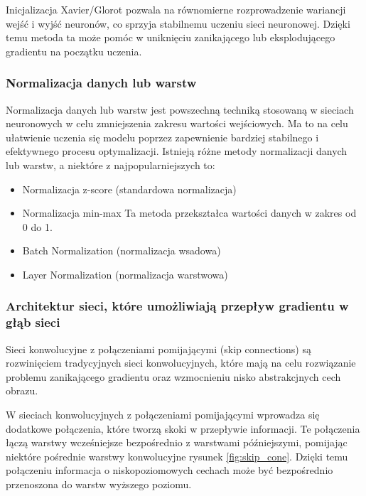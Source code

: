 \documentclass[12pt,twoside]{article}
\begin{document}
Inicjalizacja Xavier/Glorot pozwala na równomierne rozprowadzenie wariancji wejść i wyjść neuronów, co sprzyja stabilnemu uczeniu sieci neuronowej. Dzięki temu metoda ta może pomóc w uniknięciu zanikającego lub eksplodującego gradientu na początku uczenia.

\subsubsection{Normalizacja danych lub warstw}
Normalizacja danych lub warstw jest powszechną techniką stosowaną w sieciach neuronowych w celu zmniejszenia zakresu wartości wejściowych. Ma to na celu ułatwienie uczenia się modelu poprzez zapewnienie bardziej stabilnego i efektywnego procesu optymalizacji. Istnieją różne metody normalizacji danych lub warstw, a niektóre z najpopularniejszych to:

\begin{itemize}

\item Normalizacja z-score (standardowa normalizacja)

\item Normalizacja min-max
Ta metoda przekształca wartości danych w zakres od 0 do 1. 

\item Batch Normalization (normalizacja wsadowa)

\item Layer Normalization (normalizacja warstwowa)

\end{itemize}


\subsubsection{ Architektur sieci, które umożliwiają przepływ gradientu w głąb sieci }

Sieci konwolucyjne z połączeniami pomijającymi (skip connections) są rozwinięciem tradycyjnych sieci konwolucyjnych, które mają na celu rozwiązanie problemu zanikającego gradientu oraz wzmocnieniu nisko abstrakcjnych cech obrazu.

W sieciach konwolucyjnych z połączeniami pomijającymi wprowadza się dodatkowe połączenia, które tworzą skoki w przepływie informacji. Te połączenia łączą warstwy wcześniejsze bezpośrednio z warstwami późniejszymi, pomijając niektóre pośrednie warstwy konwolucyjne rysunek \ref{fig:skip_cone}. Dzięki temu połączeniu informacja o niskopoziomowych cechach może być bezpośrednio przenoszona do warstw wyższego poziomu.
\end{document}
